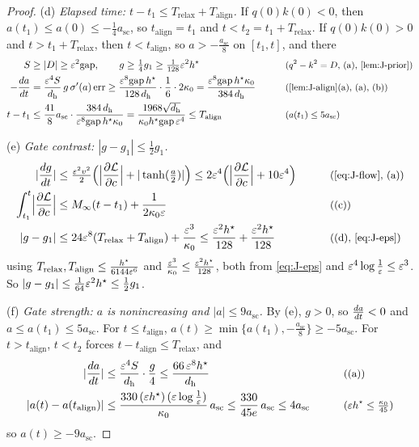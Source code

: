 \begin{proof}
\smallskip\noindent(d) \emph{Elapsed time: $t-t_1\le T_{\mathrm{relax}}+T_{\mathrm{align}}$.} If $q(0)k(0)<0$, then $a(t_1)\le a(0)\le-\frac{1}{4}a_{\mathrm{sc}}$, so
$t_{\mathrm{align}}=t_1$ and $t<t_2=t_1+T_{\mathrm{relax}}$. If $q(0)k(0)>0$ and $t>t_1+T_{\mathrm{relax}}$, then $t<t_{\mathrm{align}}$, so $a>-\frac{a_{\mathrm{sc}}}{8}$ on
$[t_1,t]$, and there
\begin{alignat*}{2}
 S&\ge|D|\ge\initscale^2\mathrm{gap},\qquad g\ge\tfrac{1}{4}g_1\ge\tfrac{1}{128}\initscale^2h^\star &\qquad& \why{$q^2-k^2=D$, (a), \cref{lem:J-prior}}\\
 -\ddt{a}&=\frac{\initscale^4S}{d_{\mathrm h}}\,g\,\sigma'(a)\,\mathrm{err}\ge\frac{\initscale^8\mathrm{gap}\,h^\star}{128\,d_{\mathrm h}}\cdot\frac{1}{6}\cdot2\kappa_0=\frac{\initscale^8\mathrm{gap}\,h^\star\kappa_0}{384\,d_{\mathrm h}} && \why{\cref{lem:J-align}(a), (a), (b)}\\
 t-t_1&\le\frac{41}{8}a_{\mathrm{sc}}\cdot\frac{384\,d_{\mathrm h}}{\initscale^8\mathrm{gap}\,h^\star\kappa_0}=\frac{1968\sqrt{d_{\mathrm h}}}{\kappa_0h^\star\mathrm{gap}\,\initscale^4}\le T_{\mathrm{align}} && \why{$a(t_1)\le5a_{\mathrm{sc}}$}
\end{alignat*}

\noindent(e) \emph{Gate contrast: $|g-g_1|\le\frac{1}{2}g_1$.}
\begin{alignat*}{2}
 |\ddt{g}|&\le\tfrac{\initscale^2v^2}{2}\Bigl(\Bigl|\pd{\mathcal L}{c}\Bigr|+|\tanh(\tfrac{a}{2})|\Bigr)\le2\initscale^4\Bigl(\Bigl|\pd{\mathcal L}{c}\Bigr|+10\initscale^4\Bigr) &\qquad& \why{\cref{eq:J-flow}, (a)}\\
 \int_{t_1}^t\Bigl|\pd{\mathcal L}{c}\Bigr|&\le M_\infty(t-t_1)+\frac{1}{2\kappa_0\initscale} && \why{(c)}\\
 |g-g_1|&\le24\initscale^8(T_{\mathrm{relax}}+T_{\mathrm{align}})+\frac{\initscale^3}{\kappa_0}\le\frac{\initscale^2h^\star}{128}+\frac{\initscale^2h^\star}{128} && \why{(d), \cref{eq:J-eps}}
\end{alignat*}
using $T_{\mathrm{relax}},T_{\mathrm{align}}\le\frac{h^\star}{6144\varepsilon^6}$ and $\frac{\varepsilon^3}{\kappa_0}\le\frac{\varepsilon^2h^\star}{128}$, both from \cref{eq:J-eps} and $\varepsilon^4\log\frac{1}{\varepsilon}\le\varepsilon^3$. So
$|g-g_1|\le\frac{1}{64}\varepsilon^2h^\star\le\frac{1}{2}g_1$.

\smallskip\noindent(f) \emph{Gate strength: $a$ is nonincreasing and $|a|\le9a_{\mathrm{sc}}$.} By (e), $g>0$, so $\ddt{a}<0$ and $a\le a(t_1)\le5a_{\mathrm{sc}}$. For $t\le t_{\mathrm{align}}$,
$a(t)\ge\min\{a(t_1),-\frac{a_{\mathrm{sc}}}{8}\}\ge-5a_{\mathrm{sc}}$. For $t>t_{\mathrm{align}}$, $t<t_2$ forces $t-t_{\mathrm{align}}\le T_{\mathrm{relax}}$, and
\begin{alignat*}{2}
 |\ddt{a}|&\le\frac{\initscale^4S}{d_{\mathrm h}}\cdot\frac{g}{4}\le\frac{66\,\initscale^8h^\star}{d_{\mathrm h}} &\qquad& \why{(a)}\\
 |a(t)-a(t_{\mathrm{align}})|&\le\frac{330\,(\initscale h^\star)\,(\initscale\log\frac{1}{\initscale})}{\kappa_0}\,a_{\mathrm{sc}}\le\frac{330}{45e}\,a_{\mathrm{sc}}\le4a_{\mathrm{sc}} && \why{$\initscale h^\star\le\tfrac{\kappa_0}{45}$}
\end{alignat*}
so $a(t)\ge-9a_{\mathrm{sc}}$.


\end{proof}
